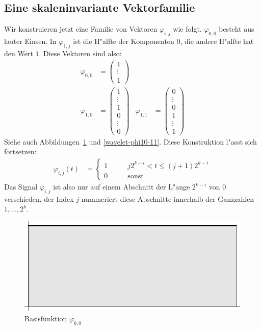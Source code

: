 \subsection{Eine skaleninvariante Vektorfamilie}
Wir konstruieren jetzt eine Familie von Vektoren $\varphi_{i,j}$
wie folgt. $\varphi_{0,0}$ besteht aus lauter Einsen. In $\varphi_{1,j}$
ist die H"alfte der Komponenten $0$, die andere H"alfte hat den
Wert $1$. 
Diese Vektoren sind also:
\begin{align*}
\varphi_{0,0}&=\begin{pmatrix}1\\\vdots\\1\end{pmatrix}
\\
\varphi_{1,0}&=\begin{pmatrix}1\\\vdots\\1\\0\\\vdots\\0\end{pmatrix}&
\varphi_{1,1}&=\begin{pmatrix}0\\\vdots\\0\\1\\\vdots\\1\end{pmatrix}
\end{align*}
Siehe auch Abbildungen~\ref{wavelet-phi00} und \ref{wavelet-phi10-11}.
Diese Konstruktion l"asst sich fortsetzen:
\begin{align*}
\varphi_{i,j}(t)&=\begin{cases}
1&\qquad j2^{k-i}<t\le (j+1)2^{k-i}\\
0&\qquad\text{sonst}
\end{cases}
\end{align*}
Das Signal $\varphi_{i,j}$ ist also nur auf einem Abschnitt der
L"ange $2^{k-i}$ von $0$ verschieden, der Index $j$ nummeriert
diese Abschnitte innerhalb der Ganzzahlen $1,\dots,2^k$.
\begin{figure}
\begin{center}
\includegraphics[width=0.45\hsize]{images/w-1}
\end{center}
\caption{Basisfunktion $\varphi_{0,0}$\label{wavelet-phi00}}
\end{figure}
